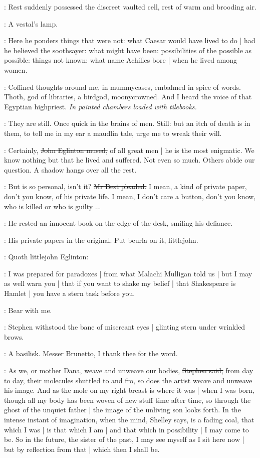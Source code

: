 \StephenInt:
Rest suddenly possessed the discreet vaulted cell,
rest of warm and brooding air.

\StephenInt:
A vestal's lamp.

\StephenInt:
Here he ponders things that were not:
what Caesar would have lived to do |
had he believed the soothsayer:
what might have been:
possibilities of the possible as possible:
things not known:
what name Achilles bore |
when he lived among women.

\StephenInt:
Coffined thoughts around me,
in mummycases,
embalmed in spice of words.
Thoth,
god of libraries,
a birdgod,
moonycrowned.
And I heard the voice of that Egyptian highpriest.
\emph{In painted chambers loaded with tilebooks.}

\StephenInt:
They are still.
Once quick in the brains of men.
Still:
but an itch of death is in them,
to tell me in my ear a maudlin tale,
urge me to wreak their will.

\eglinton:
Certainly,
\sout{John Eglinton mused,}
of all great men |
he is the most enigmatic.
We know nothing but that he lived and suffered.
Not even so much.
Others abide our question.
A shadow hangs over all the rest.

\best:
But  is so personal,
isn't it?
\sout{Mr Best pleaded.}
I mean,
a kind of private paper,
don't you know,
of his private life.
I mean,
I don't care a button,
don't you know,
who is killed or who is guilty ...

:
He rested an innocent book on the edge of the desk,
smiling his defiance.

\StephenInt:
His private papers in the original.
Put beurla on it,
littlejohn.

:
Quoth littlejohn Eglinton:

\eglinton:
I was prepared for paradoxes |
from what Malachi Mulligan told us |
but I may as well warn you |
that if you want to shake my belief |
that Shakespeare is Hamlet |
you have a stern task before you.

\StephenInt:
Bear with me.

:
Stephen withstood the bane of miscreant eyes |
glinting stern under wrinkled brows.

\StephenInt:
A basilisk.
Messer Brunetto,
I thank thee for the word.

\Stephen:
As we,
or mother Dana,
weave and unweave our bodies,
\sout{Stephen said,}
from day to day,
their molecules shuttled to and fro,
so does the artist weave and unweave his image.
And as the mole on my right breast is where it was |
when I was born,
though all my body has been woven of new stuff time after time,
so through the ghost of the unquiet father |
the image of the unliving son looks forth.
In the intense instant of imagination,
when the mind,
Shelley says,
is a fading coal,
that which I was |
is that which I am |
and that which in possibility |
I may come to be.
So in the future,
the sister of the past,
I may see myself as I sit here now |
but by reflection from that |
which then I shall be.

